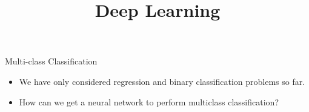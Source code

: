 





\newcommand{\titlefigure}{figure/neuralnet_new.png}
\newcommand{\learninggoals}{
  \item Neural network architectures for multi-class classification 
  \item Softmax activation function 
  \item Softmax loss}

\title{Deep Learning}
\date{}





\begin{frame} {Multi-class Classification}
\vspace{20mm}
\begin{itemize}
\item We have only considered regression and binary classification problems so far.
\vspace{5mm}
\item How can we get a neural network to perform multiclass classification?
  \end{itemize}
\end{frame}

